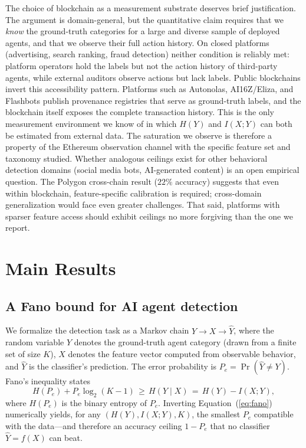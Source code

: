 \documentclass[11pt,a4paper]{article}
\begin{document}
The choice of blockchain as a measurement substrate deserves brief
justification. The argument is domain-general, but the quantitative claim
requires that we \emph{know} the ground-truth categories for a large and
diverse sample of deployed agents, and that we observe their full action
history. On closed platforms (advertising, search ranking, fraud detection)
neither condition is reliably met: platform operators hold the labels but
not the action history of third-party agents, while external auditors
observe actions but lack labels. Public blockchains invert this accessibility
pattern. Platforms such as Autonolas\cite{autonolas2022},
AI16Z/Eliza\cite{eliza2024}, and
Flashbots\cite{flashbots2021} publish provenance registries that serve as
ground-truth labels, and the blockchain itself exposes the complete
transaction history. This is the only measurement environment we know of in
which $H(Y)$ and $I(X;Y)$ can both be estimated from external data. The
saturation we observe is therefore a property of the Ethereum observation
channel with the specific feature set and taxonomy studied. Whether
analogous ceilings exist for other behavioral detection domains (social
media bots, AI-generated content) is an open empirical question. The
Polygon cross-chain result ($22\%$ accuracy) suggests that even within
blockchain, feature-specific calibration is required; cross-domain
generalization would face even greater challenges. That said, platforms
with sparser feature access should exhibit ceilings no more forgiving
than the one we report.

\section*{Main Results}

\subsection*{A Fano bound for AI agent detection}

We formalize the detection task as a Markov chain
$Y \to X \to \hat{Y}$, where the random variable $Y$ denotes the
ground-truth agent category (drawn from a finite set of size $K$), $X$
denotes the feature vector computed from observable behavior, and
$\hat{Y}$ is the classifier's prediction. The error probability is
$P_e = \Pr(\hat{Y} \neq Y)$. Fano's inequality\cite{cover2006} states
\begin{equation}
  H(P_e) + P_e \log_2(K - 1) \,\geq\, H(Y \mid X) \,=\, H(Y) - I(X;Y),
  \label{eq:fano}
\end{equation}
where $H(P_e)$ is the binary entropy of $P_e$. Inverting
Equation~(\ref{eq:fano}) numerically yields, for any $(H(Y), I(X;Y), K)$, the
smallest $P_e$ compatible with the data---and therefore an accuracy ceiling
$1 - P_e$ that no classifier $\hat{Y} = f(X)$ can beat.
\end{document}
